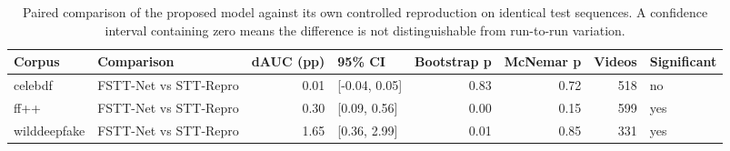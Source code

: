 \begin{table}[!t]
\centering
\caption{Paired comparison of the proposed model against its own controlled reproduction on identical test sequences. A confidence interval containing zero means the difference is not distinguishable from run-to-run variation.}
\label{tab:tableXIII_significance}
\footnotesize
\begin{tabular}{llrlrrrl}
\hline\hline
Corpus & Comparison & dAUC (pp) & 95\% CI & Bootstrap p & McNemar p & Videos & Significant \\
\hline
celebdf & FSTT-Net vs STT-Repro & 0.01 & [-0.04, 0.05] & 0.83 & 0.72 & 518 & no \\
ff++ & FSTT-Net vs STT-Repro & 0.30 & [0.09, 0.56] & 0.00 & 0.15 & 599 & yes \\
wilddeepfake & FSTT-Net vs STT-Repro & 1.65 & [0.36, 2.99] & 0.01 & 0.85 & 331 & yes \\
\hline\hline
\end{tabular}
\end{table}
